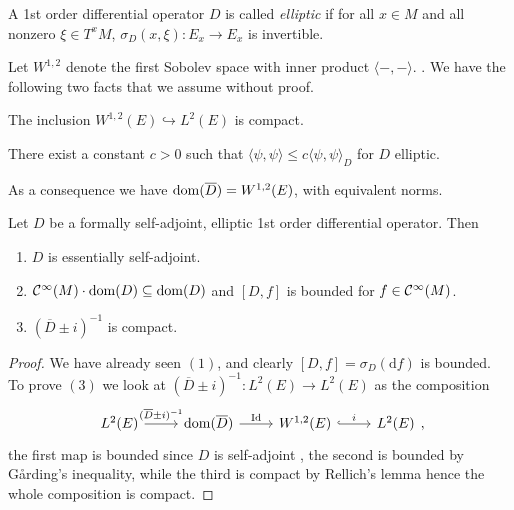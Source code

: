 \begin{definition}
 A 1st order differential operator $D$ is called \emph{elliptic} if for all $x\in M$ and all nonzero $\xi\in T^xM$, $\sigma_D(x,\xi)\colon E_x\to E_x$ is invertible.
\end{definition}

\noindent Let $W^{1,2}$ denote the first Sobolev space with inner product $\langle -,-\rangle$. . We have the following two facts that we assume without proof.
\begin{theorem}The inclusion $W^{1,2}(E)\hookrightarrow L^2(E)$ is compact.\end{theorem}
\begin{lemma} There exist a constant $c>0$ such that $\langle \psi,\psi\rangle\leq c\langle\psi,\psi\rangle_D$ for $D$ elliptic.\end{lemma}

\noindent As a consequence we have $\mathrm{dom}(\overline{D})=W^{1,2}(E)$, with equivalent norms.
\begin{theorem}
 Let $D$ be a formally self-adjoint, elliptic 1st order differential operator. Then
 \begin{enumerate}
  \item $D$ is essentially self-adjoint.
  \item $\mathcal{C}^\infty(M)\cdot\mathrm{dom}(D)\subseteq\mathrm{dom}(D)$ and $[D,f]$ is bounded for $f\in\mathcal{C}^\infty(M)$.
  \item $(\overline{D}\pm i)^{-1}$ is compact.
 \end{enumerate}
\end{theorem}
\begin{proof}
 We have already seen $(1)$, and clearly $[D,f]=\sigma_D(\mathrm{d}f)$ is bounded.\\ To prove $(3)$ we look at $(\overline{D}\pm i)^{-1}\colon L^2(E)\to L^2(E)$ as the composition
 $$\begin{tikzcd}L^2(E)\arrow["(\overline{D}\pm i)^{-1}",r] & \dom(\overline{D}) \arrow["\Id",r] & W^{1,2}(E)\arrow["i",hook,r] & L^2(E)\end{tikzcd},$$ the first map is bounded since $D$ is self-adjoint , the second is bounded by Gårding's inequality, while the third is compact by Rellich's lemma hence the whole composition is compact.
\end{proof}

